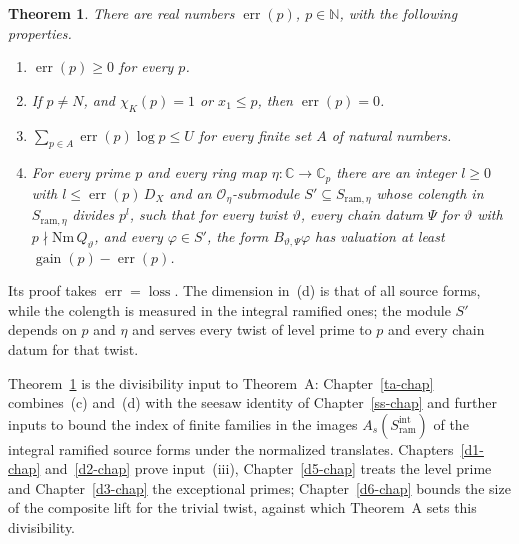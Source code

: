 \documentclass[reqno]{amsart}
\newcounter{chap}
\theoremstyle{definition}
\theoremstyle{plain}
\newtheorem{theorem}{Theorem}[section]
\theoremstyle{definition}
\theoremstyle{remark}
\newcommand{\C}{{\mathbb{C}}}
\newcommand{\Oc}{\mathcal O}
\newcommand{\gain}{\operatorname{gain}}
\newcommand{\loss}{\operatorname{loss}}
\newcommand{\err}{\operatorname{err}}
\newcommand{\ram}{\mathrm{ram}}
\newcommand{\Nm}{\mathrm{Nm}\,}
\begin{document}
\begin{theorem}\label{thm:divisibility}
There are real numbers \(\err(p)\), \(p \in \mathbb N\), with the following properties.
\begin{enumerate}
\item[(a)] \(\err(p) \ge 0\) for every \(p\).
\item[(b)] If \(p \ne N\), and \(\chi_K(p) = 1\) or \(x_1 \le p\), then \(\err(p) = 0\).
\item[(c)] \(\sum_{p \in A} \err(p)\log p \le U\) for every finite set \(A\) of natural numbers.
\item[(d)] For every prime \(p\) and every ring map \(\eta\colon \C \to \C_p\) there are an integer \(l \ge 0\) with \(l \le \err(p)\, D_X\) and an \(\Oc_\eta\)-submodule \(S' \subseteq S_{\ram,\eta}\) whose colength in \(S_{\ram,\eta}\) divides \(p^l\), such that for every twist \(\vartheta\), every chain datum \(\Psi\) for \(\vartheta\) with \(p \nmid \Nm Q_\vartheta\), and every \(\varphi \in S'\), the form \(B_{\vartheta,\Psi}\varphi\) has valuation at least \(\gain(p) - \err(p)\).
\end{enumerate}
\end{theorem}

Its proof takes \(\err = \loss\).  The dimension in~(d) is that of all source forms, while the colength is measured in the integral ramified ones; the module \(S'\) depends on \(p\) and \(\eta\) and serves every twist of level prime to \(p\) and every chain datum for that twist.

Theorem~\ref{thm:divisibility} is the divisibility input to Theorem~A: Chapter~\ref{ta-chap} combines~(c) and~(d) with the seesaw identity of Chapter~\ref{ss-chap} and further inputs to bound the index of finite families in the images \(A_s(S_\ram^{\mathrm{int}})\) of the integral ramified source forms under the normalized translates.  Chapters~\ref{d1-chap} and~\ref{d2-chap} prove input~(iii), Chapter~\ref{d5-chap} treats the level prime and Chapter~\ref{d3-chap} the exceptional primes; Chapter~\ref{d6-chap} bounds the size of the composite lift for the trivial twist, against which Theorem~A sets this divisibility.
\end{document}
